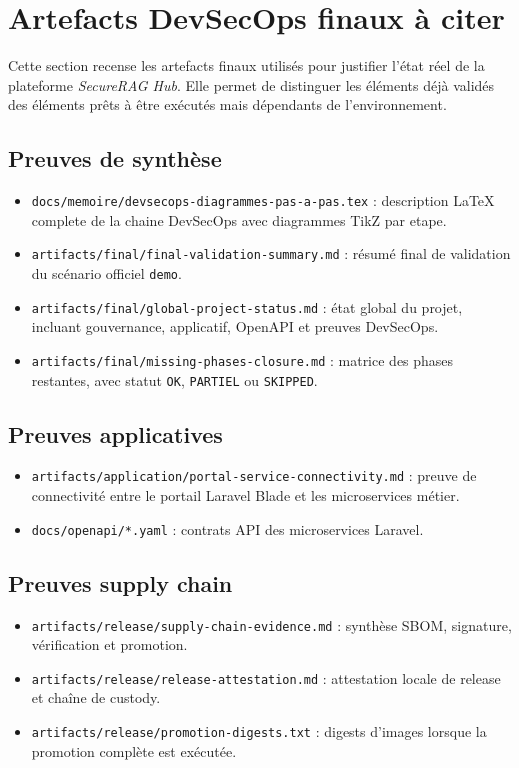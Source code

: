 \section{Artefacts DevSecOps finaux à citer}

Cette section recense les artefacts finaux utilisés pour justifier l'état réel
de la plateforme \textit{SecureRAG Hub}. Elle permet de distinguer les éléments
déjà validés des éléments prêts à être exécutés mais dépendants de
l'environnement.

\subsection{Preuves de synthèse}

\begin{itemize}
  \item \texttt{docs/memoire/devsecops-diagrammes-pas-a-pas.tex} : description
  LaTeX complete de la chaine DevSecOps avec diagrammes TikZ par etape.
  \item \texttt{artifacts/final/final-validation-summary.md} : résumé final de
  validation du scénario officiel \texttt{demo}.
  \item \texttt{artifacts/final/global-project-status.md} : état global du
  projet, incluant gouvernance, applicatif, OpenAPI et preuves DevSecOps.
  \item \texttt{artifacts/final/missing-phases-closure.md} : matrice des phases
  restantes, avec statut \texttt{OK}, \texttt{PARTIEL} ou \texttt{SKIPPED}.
\end{itemize}

\subsection{Preuves applicatives}

\begin{itemize}
  \item \texttt{artifacts/application/portal-service-connectivity.md} : preuve
  de connectivité entre le portail Laravel Blade et les microservices métier.
  \item \texttt{docs/openapi/*.yaml} : contrats API des microservices Laravel.
\end{itemize}

\subsection{Preuves supply chain}

\begin{itemize}
  \item \texttt{artifacts/release/supply-chain-evidence.md} : synthèse SBOM,
  signature, vérification et promotion.
  \item \texttt{artifacts/release/release-attestation.md} : attestation locale
  de release et chaîne de custody.
  \item \texttt{artifacts/release/promotion-digests.txt} : digests d'images
  lorsque la promotion complète est exécutée.
\end{itemize}

